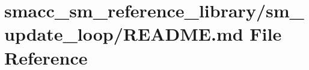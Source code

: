 \hypertarget{smacc__sm__reference__library_2sm__update__loop_2README_8md}{}\section{smacc\+\_\+sm\+\_\+reference\+\_\+library/sm\+\_\+update\+\_\+loop/\+R\+E\+A\+D\+ME.md File Reference}
\label{smacc__sm__reference__library_2sm__update__loop_2README_8md}
